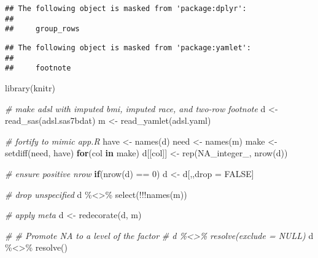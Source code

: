 \documentclass[
]{article}
\newenvironment{Shaded}{\begin{snugshade}}{\end{snugshade}}
\newcommand{\CommentTok}[1]{\textcolor[rgb]{0.56,0.35,0.01}{\textit{#1}}}
\newcommand{\ConstantTok}[1]{\textcolor[rgb]{0.00,0.00,0.00}{#1}}
\newcommand{\ControlFlowTok}[1]{\textcolor[rgb]{0.13,0.29,0.53}{\textbf{#1}}}
\newcommand{\DecValTok}[1]{\textcolor[rgb]{0.00,0.00,0.81}{#1}}
\newcommand{\FunctionTok}[1]{\textcolor[rgb]{0.00,0.00,0.00}{#1}}
\newcommand{\NormalTok}[1]{#1}
\newcommand{\OtherTok}[1]{\textcolor[rgb]{0.56,0.35,0.01}{#1}}
\newcommand{\SpecialCharTok}[1]{\textcolor[rgb]{0.00,0.00,0.00}{#1}}
\newcommand{\StringTok}[1]{\textcolor[rgb]{0.31,0.60,0.02}{#1}}
\begin{document}
\begin{verbatim}
## The following object is masked from 'package:dplyr':
## 
##     group_rows
\end{verbatim}

\begin{verbatim}
## The following object is masked from 'package:yamlet':
## 
##     footnote
\end{verbatim}

\begin{Shaded}
\begin{Highlighting}[]
\FunctionTok{library}\NormalTok{(knitr)}

\CommentTok{\# make adsl with imputed bmi, imputed race, and two{-}row footnote}
\NormalTok{d }\OtherTok{\textless{}{-}} \FunctionTok{read\_sas}\NormalTok{(}\StringTok{\textquotesingle{}adsl.sas7bdat\textquotesingle{}}\NormalTok{)}
\NormalTok{m }\OtherTok{\textless{}{-}} \FunctionTok{read\_yamlet}\NormalTok{(}\StringTok{\textquotesingle{}adsl.yaml\textquotesingle{}}\NormalTok{)}

\CommentTok{\# fortify to mimic app.R}
\NormalTok{have }\OtherTok{\textless{}{-}} \FunctionTok{names}\NormalTok{(d)}
\NormalTok{need }\OtherTok{\textless{}{-}} \FunctionTok{names}\NormalTok{(m)}
\NormalTok{make }\OtherTok{\textless{}{-}} \FunctionTok{setdiff}\NormalTok{(need, have)}
\ControlFlowTok{for}\NormalTok{(col }\ControlFlowTok{in}\NormalTok{ make) d[[col]] }\OtherTok{\textless{}{-}} \FunctionTok{rep}\NormalTok{(}\ConstantTok{NA\_integer\_}\NormalTok{, }\FunctionTok{nrow}\NormalTok{(d))}

\CommentTok{\# ensure positive nrow}
\ControlFlowTok{if}\NormalTok{(}\FunctionTok{nrow}\NormalTok{(d) }\SpecialCharTok{==} \DecValTok{0}\NormalTok{) d }\OtherTok{\textless{}{-}}\NormalTok{ d[}\StringTok{\textquotesingle{}\textquotesingle{}}\NormalTok{,,drop }\OtherTok{=} \ConstantTok{FALSE}\NormalTok{]}

\CommentTok{\# drop unspecified}
\NormalTok{d }\SpecialCharTok{\%\textless{}\textgreater{}\%} \FunctionTok{select}\NormalTok{(}\SpecialCharTok{!!!}\FunctionTok{names}\NormalTok{(m))}

\CommentTok{\# apply meta}
\NormalTok{d }\OtherTok{\textless{}{-}} \FunctionTok{redecorate}\NormalTok{(d, m)}

\CommentTok{\# \# Promote NA to a level of the factor}
\CommentTok{\# d \%\textless{}\textgreater{}\% resolve(exclude = NULL)}
\NormalTok{d }\SpecialCharTok{\%\textless{}\textgreater{}\%} \FunctionTok{resolve}\NormalTok{()}
\end{Highlighting}
\end{Shaded}
\end{document}
